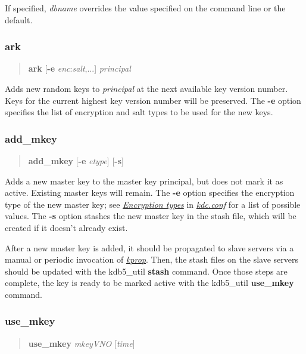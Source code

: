 \documentclass[letterpaper,10pt,english]{sphinxmanual}
\begin{document}
If specified, \emph{dbname} overrides the value specified on the command
line or the default.


\subsubsection{ark}
\label{admin/admin_commands/kdb5_util:kdb5-util-load-end}\label{admin/admin_commands/kdb5_util:ark}\begin{quote}

\textbf{ark} {[}\textbf{-e} \emph{enc}:\emph{salt},...{]} \emph{principal}
\end{quote}

Adds new random keys to \emph{principal} at the next available key version
number.  Keys for the current highest key version number will be
preserved.  The \textbf{-e} option specifies the list of encryption and
salt types to be used for the new keys.


\subsubsection{add\_mkey}
\label{admin/admin_commands/kdb5_util:add-mkey}\begin{quote}

\textbf{add\_mkey} {[}\textbf{-e} \emph{etype}{]} {[}\textbf{-s}{]}
\end{quote}

Adds a new master key to the master key principal, but does not mark
it as active.  Existing master keys will remain.  The \textbf{-e} option
specifies the encryption type of the new master key; see
{\hyperref[admin/conf_files/kdc_conf:encryption-types]{\emph{Encryption types}}} in {\hyperref[admin/conf_files/kdc_conf:kdc-conf-5]{\emph{kdc.conf}}} for a list of possible
values.  The \textbf{-s} option stashes the new master key in the stash
file, which will be created if it doesn't already exist.

After a new master key is added, it should be propagated to slave
servers via a manual or periodic invocation of {\hyperref[admin/admin_commands/kprop:kprop-8]{\emph{kprop}}}.  Then,
the stash files on the slave servers should be updated with the
kdb5\_util \textbf{stash} command.  Once those steps are complete, the key
is ready to be marked active with the kdb5\_util \textbf{use\_mkey} command.


\subsubsection{use\_mkey}
\label{admin/admin_commands/kdb5_util:use-mkey}\begin{quote}

\textbf{use\_mkey} \emph{mkeyVNO} {[}\emph{time}{]}
\end{quote}
\end{document}
